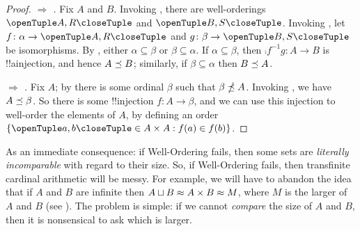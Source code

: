 \documentclass[../../../include/open-logic-section]{subfiles}
\begin{document}
\begin{proof}
\emph{ $\Rightarrow$ .} Fix $A$ and
$B$. Invoking , there are well-orderings $\tuple{A, R}$
and $\tuple{B, S}$. Invoking
, let $f \colon
\alpha \to \tuple{A, R}$ and $g \colon \beta \to \tuple{B, S}$ be
isomorphisms. By , either $\alpha \subseteq \beta$ or $\beta \subseteq \alpha$. If $\alpha \subseteq \beta$, then $\comp{f^{-1}}{g} \colon A \to B$ is !!a{injection}, and hence
$A \preceq B$; similarly, if $\beta \subseteq \alpha$ then $B \preceq A$.

\emph{ $\Rightarrow$ .} Fix $A$; by
 there is some ordinal $\beta$ such that
$\beta \npreceq A$. Invoking , we have
$A \preceq \beta$. So there is some !!{injection} $f \colon A \to
\beta$, and we can use this injection to well-order the elements of
$A$, by defining an order $\Setabs{\tuple{a, b} \in A \times A}{f(a)
\in f(b)}$.
\end{proof}
\noindent
As an immediate consequence: if Well-Ordering fails, then some sets
are \emph{literally incomparable} with regard to their size. So, if
Well-Ordering fails, then transfinite cardinal arithmetic will be
messy. For example, we will have to abandon the idea that if $A$ and
$B$ are infinite then $A \sqcup B \approx A \times
B \approx M$, where $M$ is the larger of $A$ and $B$ (see
). The problem is
simple: if we cannot \emph{compare} the size of  $A$ and $B$, then it
is nonsensical to ask which is larger.
\end{document}
